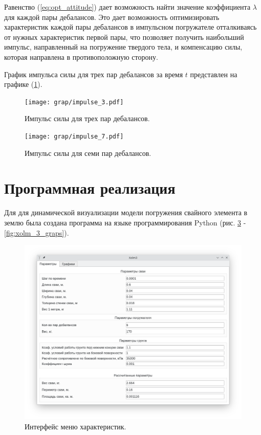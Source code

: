 Равенство (\ref{eq:opt_attitude}) дает возможность найти значение коэффициента $\lambda$ для каждой пары дебалансов.
Это дает возможность оптимизировать характеристик каждой пары дебалансов
в импульсном погружателе отталкиваясь от нужных характеристик первой пары, что позволяет получить наибольший импульс,
направленный на погружение твердого тела, и компенсацию силы, которая направлена в противоположную сторону.

График импульса силы для трех пар дебалансов за время $t$ представлен на графике (\ref{grap:impulse_3}).

\begin{figure}[h]
    \centering
    \texttt{[image: grap/impulse\_3.pdf]}
    \caption{Импульс силы для трех пар дебалансов.}
    \label{grap:impulse_3}
\end{figure}

\begin{figure}[h]
    \centering
    \texttt{[image: grap/impulse\_7.pdf]}
    \caption{Импульс силы для семи пар дебалансов.}
    \label{grap:impulse_7}
\end{figure}


\clearpage
\section{Программная реализация}
Для для динамической визуализации модели погружения свайного элемента в землю
была создана программа на языке программирования Python (рис. \ref{fig:xolm_3_params} - \ref{fig:xolm_3_graps}).

\begin{figure}[h]
    \centering
    \includegraphics[width=1\linewidth]{img/xolm_3_linux_params.png}
    \caption{Интерфейс меню характеристик.}
    \label{fig:xolm_3_params}
\end{figure}

